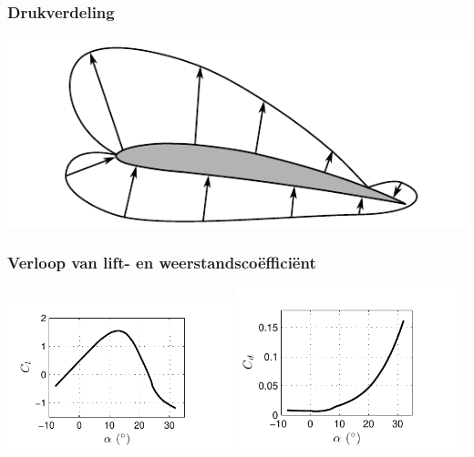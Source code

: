 \documentclass[t]{beamer}
\begin{document}
  	\begin{frame}
		\frametitle{Drukverdeling}
		\vspace{0.5cm}
		\includegraphics[width=\textwidth]{../fig/uitwendige_stroming/Vleugelprofiel_drukverdeling}
  	\end{frame}
  	\begin{frame}
		\frametitle{Verloop van lift- en weerstandscoëfficiënt}
		\vspace{1cm}
		\center
		\includegraphics[width=0.49\textwidth]{../fig/uitwendige_stroming/NACA_4412_Cl}
		\includegraphics[width=0.49\textwidth]{../fig/uitwendige_stroming/NACA_4412_Cd}
  	\end{frame}
\end{document}
